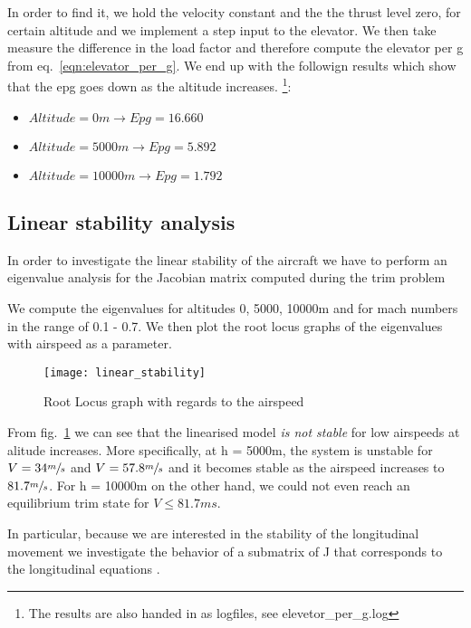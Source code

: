 In order to find it, we hold the velocity constant and the the thrust level zero,
for certain altitude and we implement a step input to the elevator. We then take
measure the difference in the load factor and therefore compute the elevator per
g from eq.~\ref{eqn:elevator_per_g}. 
We end up with the followign results which show that the epg goes down as the altitude increases.
\footnote{The results are also handed in as logfiles, see elevetor\_per\_g.log}:
\begin{itemize}
    \item $Altitude = 0 m\rightarrow Epg = 16.660$
    \item $Altitude = 5000 m \rightarrow Epg = 5.892$
    \item $Altitude = 10000 m \rightarrow Epg = 1.792$
\end{itemize}


\subsection{Linear stability analysis}

In order to investigate the linear stability of the aircraft we have to perform
an eigenvalue analysis for the Jacobian matrix computed during the trim problem

We compute the eigenvalues for altitudes 0, 5000, 10000m and for mach numbers
in the range of 0.1 - 0.7. We then plot the root locus graphs of the
eigenvalues with airspeed as a parameter.

\begin{figure}[H]
    \centering
    \texttt{[image: linear\_stability]}
    \caption{Root Locus graph with regards to the airspeed}
    \label{fig:rlocus_airspeed}
\end{figure}

From fig.~\ref{fig:rlocus_airspeed} we can see that the linearised model
\textit{is not stable} for low airspeeds at alitude increases. More
specifically, at h = 5000m, the system is unstable for $V = 34\sfrac{m}{s}$
and $V = 57.8\sfrac{m}{s}$ and it becomes stable as the airspeed increases to 
$81.7\sfrac{m}{s}$. For h = 10000m on the other hand, we could not even reach an 
equilibrium trim state for $V \leq 81.7 {m}{s}$.

In particular, because we are interested in the stability of the longitudinal
movement we investigate the behavior of a submatrix of J that corresponds to the
longitudinal equations \cite{etkin_dynamics_1972}.

